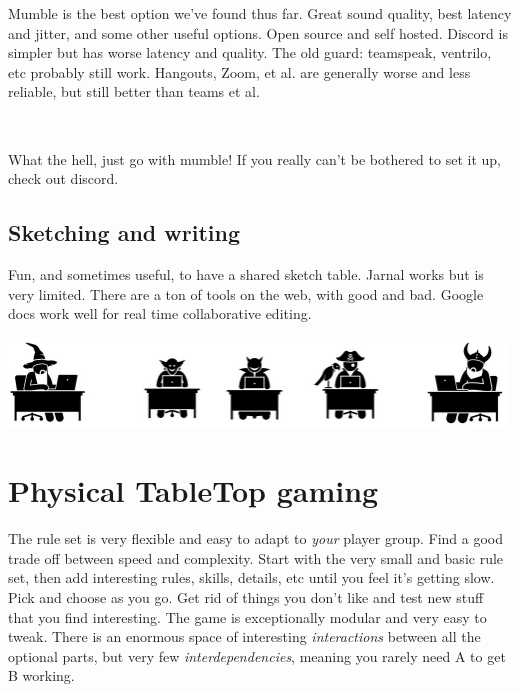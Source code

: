 Mumble is the best option we've found thus far. Great sound quality, best latency and jitter, and some other useful options. Open source and self hosted. Discord is simpler but has worse latency and quality. The old guard: teamspeak, ventrilo, etc probably still work. Hangouts, Zoom, et al. are generally worse and less reliable, but still better than teams et al.

\

\noindent
What the hell, just go with mumble! If you really can't be bothered to set it up, check out discord.


\subsection*{Sketching and writing}

Fun, and sometimes useful, to have a shared sketch table. Jarnal works but is very limited. There are a ton of tools on the web, with good and bad. Google docs work well for real time collaborative editing.


\vfill

\begin{center}
\includegraphics[width=0.99\textwidth]{./fig/online-warriors.png}
\end{center}








\clearpage %

\section*{Physical TableTop gaming}

The rule set is very flexible and easy to adapt to \emph{your} player group. Find a good trade off between speed and complexity. Start with the very small and basic rule set, then add interesting rules, skills, details, etc until you feel it's getting slow. Pick and choose as you go. Get rid of things you don't like and test new stuff that you find interesting. The game is exceptionally modular and very easy to tweak. There is an enormous space of interesting \emph{interactions} between all the optional parts, but very few \emph{interdependencies}, meaning you rarely need A to get B working.


